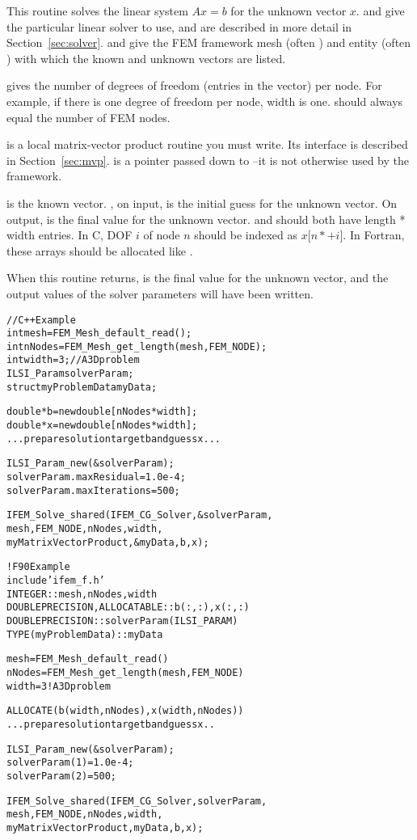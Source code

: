 \documentclass[10pt]{article}
\begin{document}
This routine solves the linear system $A x = b$ for the unknown vector $x$.   and  give the particular linear solver to use, and are described in more detail in Section~\ref{sec:solver}.   and  give the FEM framework mesh (often ) and entity (often ) with which the known and unknown vectors are listed.

 gives the number of degrees of freedom (entries in the vector) per node. For example, if there is one degree of freedom per node, width is one.   should always equal the number of FEM nodes.

 is a local matrix-vector product routine you must write.  Its interface is described in Section~\ref{sec:mvp}.  is a pointer passed down to --it is not otherwise used by the framework.  

 is the known vector.  , on input, is the initial guess for the unknown vector.  On output,  is the final value for the unknown vector.   and  should both have length * width entries.  In C, DOF $i$ of node $n$ should be indexed as $x[n*$$+i]$.  In Fortran, these arrays should be allocated like .

When this routine returns,  is the final value for the unknown vector, and the output values of the solver parameters  will have been written.

\begin{alltt}
// C++ Example
  int mesh=FEM_Mesh_default_read();
  int nNodes=FEM_Mesh_get_length(mesh,FEM_NODE);
  int width=3; //A 3D problem
  ILSI_Param solverParam;
  struct myProblemData myData;
  
  double *b=new double[nNodes*width];
  double *x=new double[nNodes*width];
  ... prepare solution target b and guess x ...
  
  ILSI_Param_new(&solverParam);
  solverParam.maxResidual=1.0e-4;
  solverParam.maxIterations=500; 
  
  IFEM_Solve_shared(IFEM_CG_Solver,&solverParam,
         mesh,FEM_NODE, nNodes,width,
         myMatrixVectorProduct, &myData, b,x);
  
! F90 Example
  include 'ifem\_f.h'
  INTEGER :: mesh, nNodes,width
  DOUBLE PRECISION, ALLOCATABLE :: b(:,:), x(:,:)
  DOUBLE PRECISION :: solverParam(ILSI_PARAM)
  TYPE(myProblemData) :: myData
  
  mesh=FEM_Mesh_default_read()
  nNodes=FEM_Mesh_get_length(mesh,FEM_NODE)
  width=3   ! A 3D problem
  
  ALLOCATE(b(width,nNodes), x(width,nNodes))
  ... prepare solution target b and guess x ..
  
  ILSI_Param_new(&solverParam);
  solverParam(1)=1.0e-4;
  solverParam(2)=500; 
  
  IFEM_Solve_shared(IFEM_CG_Solver,solverParam,
         mesh,FEM_NODE, nNodes,width,
         myMatrixVectorProduct, myData, b,x);

\end{alltt}
\end{document}
